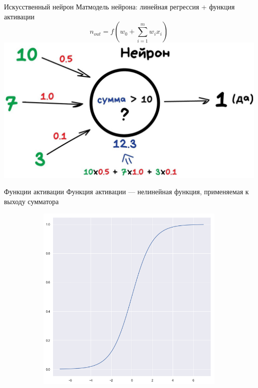\documentclass[aspectratio=169]{beamer}
\begin{document}
\begin{frame}{Искусственный нейрон}
    \centering
    \small Матмодель нейрона: линейная регрессия + функция активации
    \[ n_{out} = f(w_0 + \sum^{m}_{i=1} w_i x_i) \]
    \includegraphics[width=.6\linewidth]{figures/fig10.jpg}
\end{frame}

\begin{frame}{Функции активации}
    \small Функция активации --- нелинейная функция, применяемая к выходу сумматора
    \begin{figure}
        \begin{subfigure}[b]{.32\linewidth}
            \centering
            \includegraphics[width=\linewidth]{figures/fig11.png}
        \end{subfigure}
        \begin{subfigure}[b]{.32\linewidth}

\end{subfigure}
\end{figure}
\end{frame}
\end{document}
